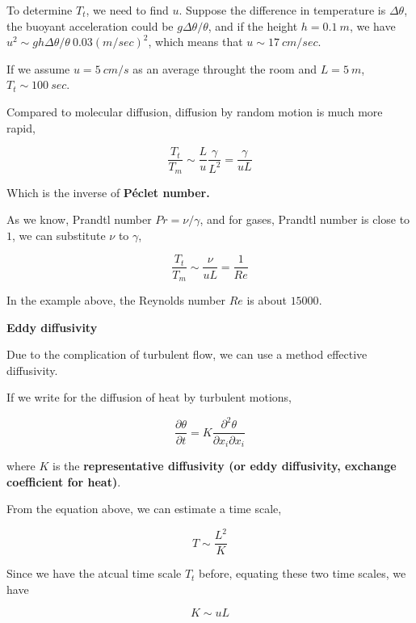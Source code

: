 \documentclass{article}
\begin{document}
To determine $T_t$, we need to find $u$. Suppose the difference in temperature is $\Delta\theta$, the buoyant acceleration could be $g\Delta\theta/\theta$, and if the height $h=0.1\ m$, we have $u^2\sim gh\Delta \theta/\theta~0.03 (m/sec)^2$, which means that $u\sim 17\ cm/sec$.

If we assume $u=5\ cm/s$ as an average throught the room and $L=5\ m$, $T_t\sim 100\ sec$.

Compared to molecular diffusion, diffusion by random motion is much more rapid,

\begin{equation*}
    \frac{T_t}{T_m}\sim\frac{L}{u}\frac{\gamma}{L^2}=\frac{\gamma}{uL}
\end{equation*}

Which is the inverse of \textbf{P\'eclet number.}

As we know, Prandtl number $Pr=\nu/\gamma$, and for gases, Prandtl number is close to $1$, we can substitute $\nu$ to $\gamma$,

\begin{equation*}
    \frac{T_t}{T_m}\sim\frac{\nu}{uL}=\frac{1}{Re}
\end{equation*}

In the example above, the Reynolds number $Re$ is about $15000$.

\textbf{Eddy diffusivity}

Due to the complication of turbulent flow, we can use a method effective diffusivity.

If we write for the diffusion of heat by turbulent motions,

\begin{equation*}
    \frac{\partial\theta}{\partial t}=K\frac{\partial^2\theta}{\partial x_i\partial x_i}
\end{equation*}

where $K$ is the \textbf{representative diffusivity (or eddy diffusivity, exchange coefficient for heat)}.

From the equation above, we can estimate a time scale,

\begin{equation*}
    T\sim\frac{L^2}{K}
\end{equation*}

Since we have the atcual time scale $T_t$ before, equating these two time scales, we have

\begin{equation*}
    K\sim uL
\end{equation*}
\end{document}
